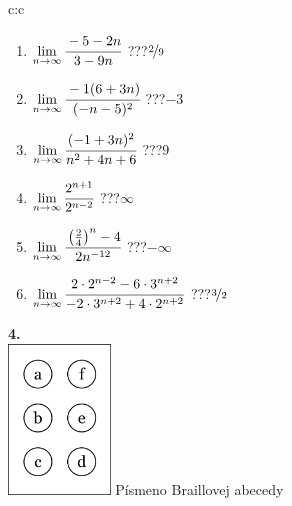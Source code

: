 \documentclass[10pt]{report}
\begin{document}
\begin{tabular}{c:c}
\begin{minipage}[c][104.5mm][t]{0.5\linewidth}
\begin{center}
\begin{minipage}{0.79\linewidth}
\begin{center}
\begin{varwidth}{\linewidth}
\begin{enumerate}
\normalsize
\item $\lim\limits_{n\to\infty}\cfrac{-5-2n}{3-9n}$\quad \dotfill\; ???\;\dotfill \quad $\nicefrac{2}{9}$
\item $\lim\limits_{n\to\infty}\cfrac{-1(6+3n)}{(-n-5)^2}$\quad \dotfill\; ???\;\dotfill \quad $-3$
\item $\lim\limits_{n\to\infty}\cfrac{(-1+3n)^2}{n^2+4n+6}$\quad \dotfill\; ???\;\dotfill \quad $9$
\item $\lim\limits_{n\to\infty}\cfrac{2^{n+1}}{2^{n-2}}$\quad \dotfill\; ???\;\dotfill \quad $\infty$
\item $\lim\limits_{n\to\infty}\cfrac{\left(\frac{2}{4}\right)^n -4}{2n^{-12}}$\quad \dotfill\; ???\;\dotfill \quad $-\infty$
\item $\lim\limits_{n\to\infty}\cfrac{2\cdot 2^{n-2}-6\cdot 3^{n+2}}{-2\cdot 3^{n+2}+4\cdot 2^{n+2}}$\quad \dotfill\; ???\;\dotfill \quad $\nicefrac{3}{2}$
\end{enumerate}
\end{varwidth}
\end{center}
\end{minipage}
\begin{minipage}{0.20\linewidth}
\begin{center}
{\Huge\bfseries 4.} \\[2mm]
\includegraphics[height=40mm]{../images/braille.png}
{\small Písmeno Braillovej abecedy}
\end{center}
\end{minipage}
\end{center}
\end{minipage}
%
\end{tabular}
\newpage
\thispagestyle{empty}
\end{document}

